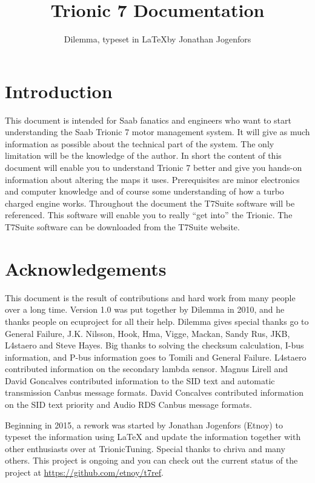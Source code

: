 \documentclass[11pt,a4paper]{book}
\begin{document}
\title{Trionic 7 Documentation}
\author{Dilemma, typeset in \LaTeX by Jonathan Jogenfors}

\maketitle
\clearpage
\frontmatter
\chapter{Introduction}
This document is intended for Saab fanatics and engineers who want to start
understanding the Saab Trionic 7 motor management system. It will give as much
information as possible about the technical part of the system. The only
limitation will be the knowledge of the author. In short the content of this
document will enable you to understand Trionic 7 better and give you hands-on
information about altering the maps it uses. Prerequisites are minor electronics
and computer knowledge and of course some understanding of how a turbo charged
engine works. Throughout the document the T7Suite software will be referenced.
This software will enable you to really \enquote{get into} the Trionic. The T7Suite
software can be downloaded from the T7Suite website.

\chapter{Acknowledgements}
This document is the result of contributions and hard work from many people over
a long time. Version 1.0 was put together by Dilemma in 2010, and he thanks
people on ecuproject for all their help. Dilemma gives special thanks go to General
Failure, J.K. Nilsson, Hook, Hma, Vigge, Mackan, Sandy Rus, JKB, L4staero and
Steve Hayes. Big thanks to solving the checksum calculation, I-bus information,
and P-bus information goes to Tomili and General Failure. L4staero contributed
information on the secondary lambda sensor. Magnus Lirell and David Goncalves
contributed information to the SID text and automatic transmission Canbus
message formats. David Concalves contributed information on the SID text
priority and Audio RDS Canbus message formats.

Beginning in 2015, a rework was started by Jonathan Jogenfors (Etnoy) to typeset
the information using \LaTeX{} and update the information together with other
enthusiasts over at TrionicTuning. Special thanks to chriva and many others.
This project is ongoing and you can check out the current status of the project
at \url{https://github.com/etnoy/t7ref}.
\end{document}
